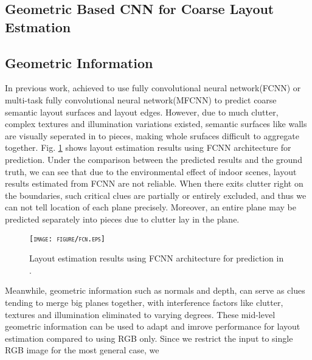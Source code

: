 \subsection{Geometric Based CNN for Coarse Layout Estmation}
\label{subsection:CNN}

\subsection{Geometric Information}
In previous work, \cite{dasgupta2016delay} \cite{ren2016coarse} achieved to use fully convolutional neural network(FCNN) or multi-task fully convolutional neural network(MFCNN) to predict coarse semantic layout surfaces and layout edges. However, due to much clutter, complex textures and illumination variations existed, semantic surfaces like walls are visually seperated in to pieces, making whole srufaces difficult to aggregate together. Fig. \ref{fig:fcn} shows layout estimation results using FCNN architecture for prediction. Under the comparison between the predicted results and the ground truth, we can see that due to the environmental effect of indoor scenes, layout results estimated from FCNN are not reliable. When there exits clutter right on the boundaries, such critical clues are partially or entirely excluded, and thus we can not tell location of each plane precisely. Moreover, an entire plane may be predicted separately into pieces due to clutter lay in the plane.


\begin{figure}[!htq]
	\centering
	\textsc{\texttt{[image: figure/fcn.eps]}}
	\caption{Layout estimation results using FCNN architecture for prediction in \cite{dasgupta2016delay} \cite{ren2016coarse}.}
	\label{fig:fcn}
\end{figure}



Meanwhile, geometric information such as normals and depth, can serve as clues tending to merge big planes together, with interference factors like clutter, textures and illumination eliminated to varying degrees. These mid-level geometric information can be used to adapt and imrove performance for layout estimation compared to using RGB only. Since we restrict the input to single RGB image for the most general case, we 






